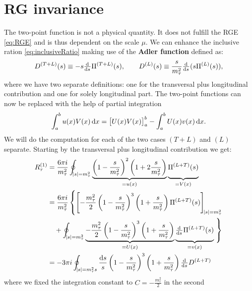 \documentclass[../../index.tex]{subfiles}
\begin{document}
\section{RG invariance}
The two-point function is not a physical quantity. It does not fulfill the RGE
\cref{eq:RGE} and is thus dependent on the scale $\mu$. We can enhance the
inclusive ration \cref{eq:inclusiveRatio} making use of the \textbf{Adler function} defined as:
\begin{equation}
  \label{eq:adlerFunction}
  D^{(T+L)}(s) \equiv -s \od{}{s} \Pi^{(T+L)}(s), \qquad D^{(L)}(s) \equiv \frac{s}{m_\tau^2} \od{}{s} (s \Pi^{(L)}(s)),
\end{equation}
where we have two separate definitions: one for the transversal plus longitudinal
contribution and one for solely longitudinal part. The two-point functions can now be replaced with the help of partial integration
\begin{equation}
  \int_a^b u(x) V(x) \dif x = \left[ U(x) V(x) \right]_a^b - \int_a^b U(x) v(x) \dif x.
\end{equation}
We will do the computation for each of the two cases $(T+L)$ and $(L)$ separate.
Starting by the transversal plus longitudinal contribution we get:
\begin{equation}
  \begin{split}
    R_\tau^{(1)} &= \frac{6 \pi i}{m_\tau^2} \oint_{\abs{s}=m_\tau^2}\underbrace{\left( 1 - \frac{s}{m_\tau^2} \right)^2 \left( 1 + 2 \frac{s}{m_\tau^2} \right)}_{=u(x)} \underbrace{ \vphantom{\left( \frac{s}{m_\tau^2} \right)} \Pi^{(L+T)}(s)}_{=V(x)} \\
    &= \frac{6 \pi i}{m_\tau^2} \left\{  \left[ -\frac{m_\tau^2}{2} \left( 1 - \frac{s}{m_\tau^2} \right)^3 \left( 1 + \frac{s}{m_\tau^2} \right) \Pi^{(L+T)}(s) \right]_{\abs{s}=m_\tau^2} \right. \\
    &\quad+ \oint_{\abs{s}=m_\tau^2} \underbrace{-\frac{m_\tau^2}{2} \left( 1 - \frac{s}{m_\tau^2} \right)^3 \left( 1 + \frac{s}{m_\tau^2} \right)}_{=U(x)} \underbrace{\vphantom{\left( \frac{1}{m_\tau^2} \right)}\od{}{s} \Pi^{(L+T)}(s)}_{=v(x)} \left. \vphantom{\left[ \left( \frac{1}{m_\tau^2} \right) \right]} \right\} \\
    &= -3 \pi i \oint_{\abs{s}=m_\tau^2s} \frac{\dif s}{s} \left( 1 - \frac{s}{m_\tau^2} \right)^3 \left( 1 + \frac{s}{m_\tau^2} \right) \od{}{s} D^{(L+T)}
  \end{split}
\end{equation}
where we fixed the integration constant to $C=-\frac{m_\tau^2}{2}$ in the second
\end{document}
